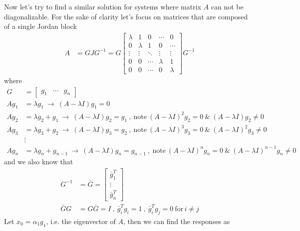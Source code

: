 \documentclass[twoside]{article}
\begin{document}
Now let's try to find a similar solution for systems where matrix $A$ can not be diagonalizable. For the sake of clarity let's focus on 
matrices that are composed of a single Jordan block
%
\begin{align*}
A &= G J G^{-1} = G \begin{bmatrix} \lambda & 1 & 0 & \cdots & 0 \\ 0 & \lambda & 1 & 0 & \cdots \\ \vdots & \vdots & \ddots & \vdots & \vdots \\ 0 & 0 & \cdots & \lambda & 1 \\ 0 & 0 & \cdots & 0 & \lambda \end{bmatrix} G^{-1} 
\end{align*}
%
\noindent where
%
\begin{align*}
     G &= \begin{bmatrix} g_1 & \cdots & g_n \end{bmatrix}
     \\[1ex]
 A g_1 &= \lambda g_1 \ \rightarrow \ (A - \lambda I) g_1 = 0
    \\[1ex]
    A g_2 &= \lambda g_2 + g_1 \ \rightarrow \ (A - \lambda I) g_2 = g_1 \ , \ \mathrm{note} \ (A - \lambda I)^2 g_2 = 0 \ \& \ (A - \lambda I) g_2 \neq 0
        \\[1ex]
    A g_3 &= \lambda g_3 + g_2 \ \rightarrow \ (A - \lambda I) g_3 = g_2 \ , \ \mathrm{note} \ (A - \lambda I)^3 g_3 = 0 \ \& \ (A - \lambda I)^2 g_3 \neq 0
    \\[1ex]
    &\vdots
    \\[1ex]
    A g_{n} &= \lambda g_{n} + g_{n-1} \ \rightarrow \ (A - \lambda I) g_n = g_{n-1} \ , \ \mathrm{note} \ (A - \lambda I)^n g_n = 0 \ \& \ (A - \lambda I)^{n-1} g_{n} \neq 0
\end{align*}
and we also know that
\begin{align*}
 G^{-1} &= \bar{G} =  \begin{bmatrix} \bar{g}_1^T \\ \vdots \\ \bar{g}_n^T \end{bmatrix} 
  \\[1ex]
\bar{G} G &= G \bar{G} = I \ , \ \bar{g}_i^T g_i = 1 \ , \  \bar{g}_i^T g_j = 0 \ \mathrm{for} \, i \neq j
\end{align*}
%
Let $x_0 = \alpha_1 g_1$, i.e. the eigenvector of $A$, then we can find the responses as
%
\end{document}
